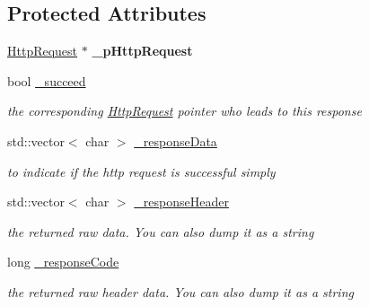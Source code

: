\subsection*{Protected Attributes}
\begin{DoxyCompactItemize}
\item 
\mbox{\label{classnetwork_1_1HttpResponse_a814e0430e7ab6afeca71e46871bc0af2}} 
\hyperlink{classnetwork_1_1HttpRequest}{Http\+Request} $\ast$ {\bfseries \+\_\+p\+Http\+Request}
\item 
\mbox{\label{classnetwork_1_1HttpResponse_afd0352975a0739c7d155b4ae26808ebd}} 
bool \hyperlink{classnetwork_1_1HttpResponse_afd0352975a0739c7d155b4ae26808ebd}{\+\_\+succeed}
\begin{DoxyCompactList}\small\item\em the corresponding \hyperlink{classnetwork_1_1HttpRequest}{Http\+Request} pointer who leads to this response \end{DoxyCompactList}\item 
\mbox{\label{classnetwork_1_1HttpResponse_a24ac760b699a3fedab7f11b19f87a098}} 
std\+::vector$<$ char $>$ \hyperlink{classnetwork_1_1HttpResponse_a24ac760b699a3fedab7f11b19f87a098}{\+\_\+response\+Data}
\begin{DoxyCompactList}\small\item\em to indicate if the http request is successful simply \end{DoxyCompactList}\item 
\mbox{\label{classnetwork_1_1HttpResponse_ac1b35e97692751f5e3eda41358683fd0}} 
std\+::vector$<$ char $>$ \hyperlink{classnetwork_1_1HttpResponse_ac1b35e97692751f5e3eda41358683fd0}{\+\_\+response\+Header}
\begin{DoxyCompactList}\small\item\em the returned raw data. You can also dump it as a string \end{DoxyCompactList}\item 
\mbox{\label{classnetwork_1_1HttpResponse_a2f6fbcd065e878f765aab47ca708a492}} 
long \hyperlink{classnetwork_1_1HttpResponse_a2f6fbcd065e878f765aab47ca708a492}{\+\_\+response\+Code}
\begin{DoxyCompactList}\small\item\em the returned raw header data. You can also dump it as a string \end{DoxyCompactList}\item 

\end{DoxyCompactItemize}
